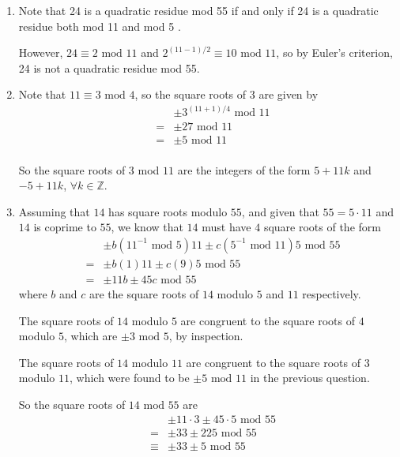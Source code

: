 \begin{enumerate}

\item Note that 24 is a quadratic residue mod 55 if and only if 24 is a
quadratic residue both mod 11 and mod 5 \cite{slides_99}.

However, $24 \equiv 2 \textrm{ mod } 11$ and
$2^{(11-1)/2} \equiv 10 \textrm{ mod } 11$, so by Euler's criterion, 24 is not
a quadratic residue mod 55.

\item Note that $11 \equiv 3 \textrm{ mod } 4$, so the square roots of 3 are
given by \cite{slides_92}
\begin{eqnarray*}
&& \pm 3^{(11+1)/4} \textrm{ mod } 11 \\
&=& \pm 27 \textrm{ mod } 11 \\
&=& \pm 5 \textrm{ mod } 11 \\
\end{eqnarray*}

So the square roots of $3$ mod $11$ are the integers of the form $5 + 11k$ and
$-5 + 11k$, $\forall k \in \mathbb{Z}$.

\item Assuming that $14$ has square roots modulo $55$, and given that
$55 = 5 \cdot 11$ and $14$ is coprime to $55$, we know that $14$ must have $4$
square roots of the form
\begin{eqnarray*}
&& \pm b(11^{-1} \textrm{ mod } 5)11 \pm c(5^{-1} \textrm{ mod } 11)5
\textrm{ mod } 55 \\
&=& \pm b(1)11 \pm c(9)5 \textrm{ mod } 55 \\
&=& \pm 11b \pm 45c \textrm{ mod } 55
\end{eqnarray*}
where $b$ and $c$ are the square roots of $14$ modulo $5$ and $11$ respectively.
\cite{slides_100}

The square roots of $14$ modulo $5$ are congruent to the square roots of $4$
modulo $5$, which are $\pm 3 \textrm{ mod } 5$, by inspection.

The square roots of $14$ modulo $11$ are congruent to the square roots of $3$
modulo $11$, which were found to be $\pm 5 \textrm{ mod } 11$ in the previous
question.

So the square roots of $14 \textrm{ mod } 55$ are
\begin{eqnarray*}
&& \pm 11 \cdot 3 \pm 45 \cdot 5 \textrm{ mod } 55 \\
&=& \pm 33 \pm 225 \textrm{ mod } 55 \\
&\equiv& \pm 33 \pm 5 \textrm{ mod } 55 \\
\end{eqnarray*}


\end{enumerate}
